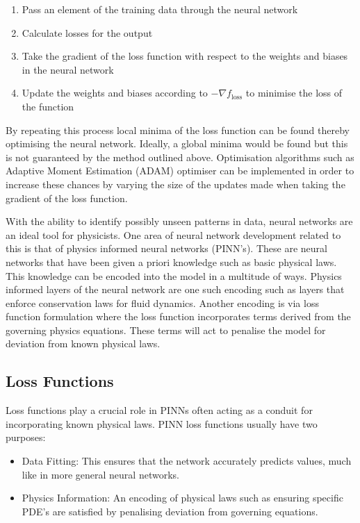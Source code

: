 \documentclass[10pt]{iopart}
\begin{document}
 \begin{enumerate}
 	\item Pass an element of the training data through the neural network
 	\item Calculate losses for the output
 	\item Take the gradient of the loss function with respect to the weights and biases in the neural network
 	\item Update the weights and biases according to $-\nabla f_{\mathrm{loss}}$ to minimise the loss of the function
 \end{enumerate}
 
By repeating this process local minima of the loss function can be found thereby optimising the neural network. 
Ideally, a global minima would be found but this is not guaranteed by the method outlined above. Optimisation algorithms such as Adaptive Moment Estimation (ADAM) optimiser \cite{ADAM} can be implemented in order to increase these chances by varying the size of the updates made when taking the gradient of the loss function.

With the ability to identify possibly unseen patterns in data, neural networks are an ideal tool for physicists. One area of neural network development related to this is that of physics informed neural networks (PINN's). These are neural networks that have been given a priori knowledge such as basic physical laws. This knowledge can be encoded into the model in a multitude of ways. Physics informed layers of the neural network are one such encoding such as layers that enforce conservation laws for fluid dynamics. Another encoding is via loss function formulation where the loss function incorporates terms derived from the governing physics equations. These terms will act to penalise the model for deviation from known physical laws. 

\subsection{Loss Functions}
Loss functions play a crucial role in PINNs often acting as a conduit for incorporating known physical laws. PINN loss functions usually have two purposes:
\begin{itemize}
	\item Data Fitting: This ensures that the network accurately predicts values, much like in more general neural networks.
	\item Physics Information: An encoding of physical laws such as ensuring specific PDE's are satisfied by penalising deviation from governing equations. 
\end{itemize}
\end{document}
